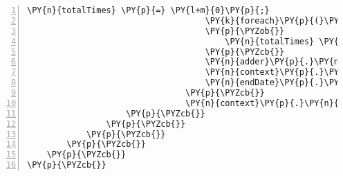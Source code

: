 \begin{Verbatim}[commandchars=\\\{\},numbers=left,firstnumber=1,stepnumber=1,numberblanklines=0]
                                    \PY{n}{totalTimes} \PY{p}{=} \PY{l+m}{0}\PY{p}{;}
                                    \PY{k}{foreach}\PY{p}{(}\PY{n}{TimeSpan} \PY{n}{time} \PY{k}{in} \PY{n}{declineTimes}\PY{p}{)}
                                    \PY{p}{\PYZob{}}
                                        \PY{n}{totalTimes} \PY{p}{+}\PY{p}{=} \PY{n}{t}\PY{p}{.}\PY{n}{TotalMilliseconds}\PY{p}{;}
                                    \PY{p}{\PYZcb{}}
                                    \PY{n}{adder}\PY{p}{.}\PY{n}{avgDeclineTime} \PY{p}{=} \PY{n}{TimeSpan}\PY{p}{.}\PY{n}{FromMilliseconds}\PY{p}{(}\PY{n}{totalTimes} \PY{p}{/} \PY{n}{declineTimes}\PY{p}{.}\PY{n}{Count}\PY{p}{(}\PY{p}{)}\PY{p}{)}\PY{p}{;}
                                    \PY{n}{context}\PY{p}{.}\PY{n}{Stats}\PY{p}{.}\PY{n}{Add}\PY{p}{(}\PY{n}{adder}\PY{p}{)}\PY{p}{;}
                                    \PY{n}{endDate}\PY{p}{.}\PY{n}{AddDays}\PY{p}{(}\PY{p}{\PYZhy{}}\PY{l+m}{1}\PY{p}{)}\PY{p}{;}
                                \PY{p}{\PYZcb{}}
                                \PY{n}{context}\PY{p}{.}\PY{n}{SaveChanges}\PY{p}{(}\PY{p}{)}\PY{p}{;}
                    \PY{p}{\PYZcb{}}
                \PY{p}{\PYZcb{}}
            \PY{p}{\PYZcb{}}
        \PY{p}{\PYZcb{}}
    \PY{p}{\PYZcb{}}
\PY{p}{\PYZcb{}}
\end{Verbatim}
